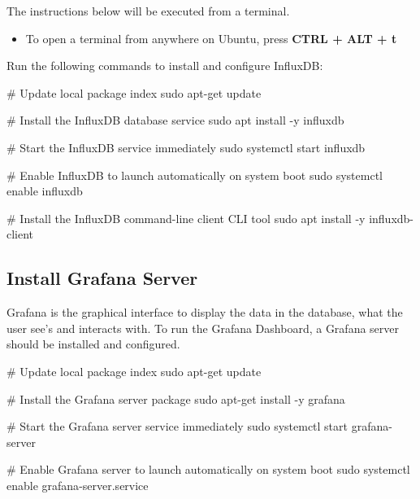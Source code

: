 \documentclass[
  letterpaper,
]{scrbook}
\newenvironment{Shaded}{\begin{snugshade}}{\end{snugshade}}
\newcommand{\AttributeTok}[1]{\textcolor[rgb]{0.40,0.45,0.13}{#1}}
\newcommand{\CommentTok}[1]{\textcolor[rgb]{0.37,0.37,0.37}{#1}}
\newcommand{\FunctionTok}[1]{\textcolor[rgb]{0.28,0.35,0.67}{#1}}
\newcommand{\NormalTok}[1]{\textcolor[rgb]{0.00,0.23,0.31}{#1}}
\providecommand{\tightlist}{%
  \setlength{\itemsep}{0pt}\setlength{\parskip}{0pt}}
\begin{document}
The instructions below will be executed from a terminal.

\begin{itemize}
\tightlist
\item
  To open a terminal from anywhere on Ubuntu, press \textbf{CTRL + ALT +
  t}
\end{itemize}

Run the following commands to install and configure InfluxDB:

\begin{Shaded}
\begin{Highlighting}[]
\CommentTok{\# Update local package index}
\FunctionTok{sudo}\NormalTok{ apt{-}get update}

\CommentTok{\# Install the InfluxDB database service}
\FunctionTok{sudo}\NormalTok{ apt install }\AttributeTok{{-}y}\NormalTok{ influxdb}

\CommentTok{\# Start the InfluxDB service immediately}
\FunctionTok{sudo}\NormalTok{ systemctl start influxdb}

\CommentTok{\# Enable InfluxDB to launch automatically on system boot}
\FunctionTok{sudo}\NormalTok{ systemctl enable influxdb}

\CommentTok{\# Install the InfluxDB command{-}line client CLI tool}
\FunctionTok{sudo}\NormalTok{ apt install }\AttributeTok{{-}y}\NormalTok{ influxdb{-}client}
\end{Highlighting}
\end{Shaded}

\subsection{Install Grafana Server}\label{install-grafana-server}

Grafana is the graphical interface to display the data in the database,
what the user see's and interacts with. To run the Grafana Dashboard, a
Grafana server should be installed and configured.

\begin{Shaded}
\begin{Highlighting}[]
\CommentTok{\# Update local package index}
\FunctionTok{sudo}\NormalTok{ apt{-}get update}

\CommentTok{\# Install the Grafana server package}
\FunctionTok{sudo}\NormalTok{ apt{-}get install }\AttributeTok{{-}y}\NormalTok{ grafana}

\CommentTok{\# Start the Grafana server service immediately}
\FunctionTok{sudo}\NormalTok{ systemctl start grafana{-}server}

\CommentTok{\# Enable Grafana server to launch automatically on system boot}
\FunctionTok{sudo}\NormalTok{ systemctl enable grafana{-}server.service}
\end{Highlighting}
\end{Shaded}
\end{document}
